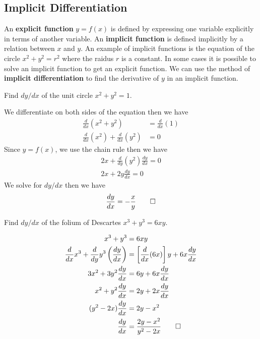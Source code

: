 \subsection{Implicit Differentiation}
An \textbf{explicit function} \(y=f(x)\) is defined by expressing one variable
explicitly in terms of another variable.
An \textbf{implicit function} is defined implicitly by a relation between
\(x\) and \(y\).
An example of implicit functions is the equation of the circle \(x^2+y^2=r^2\)
where the raidus \(r\) is a constant.
In some cases it is possible to solve an implicit function to get an explicit function.
We can use the method of \textbf{implicit differentiation} to find the derivative
of \(y\) in an implicit function.
\begin{problem}
    Find \(dy/dx\) of the unit circle \(x^2+y^2=1\).
\end{problem}
\begin{solution}
    We differentiate on both sides of the equation then we have
    \begin{align*}
        \frac{d}{dx}(x^2+y^2)&=\frac{d}{dx}(1)\\
        \frac{d}{dx}(x^2)+\frac{d}{dx}(y^2)&=0
    \end{align*}
    Since \(y=f(x)\), we use the chain rule then we have
    \begin{align*}
        2x+\frac{d}{dy}(y^2)\frac{dy}{dx}=0\\
        2x+2y\frac{dy}{dx}=0
    \end{align*}
    We solve for \(dy/dx\) then we have
    \[\frac{dy}{dx}=-\frac{x}{y}\qedhere\]
\end{solution}
\begin{problem}
    Find \(dy/dx\) of the folium of Descartes \(x^3+y^3=6xy\).
\end{problem}
\begin{solution}
    \begin{align*}
        x^3+y^3&=6xy\\\frac{d}{dx}x^3+\frac{d}{dy}y^3\left(\frac{dy}{dx}\right)
        &=\left[\frac{d}{dx}(6x)\right]y+6x\frac{dy}{dx}\\3x^2+3y^2\frac{dy}{dx}
        &=6y+6x\frac{dy}{dx}\\x^2+y^2\frac{dy}{dx}&=2y+2x\frac{dy}{dx}
        \\(y^2-2x)\frac{dy}{dx}&=2y-x^2\\\frac{dy}{dx}&=\frac{2y-x^2}{y^2-2x}\qedhere
    \end{align*}
\end{solution}